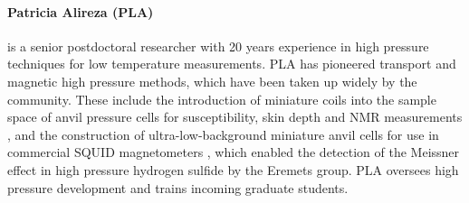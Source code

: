 \paragraph{Patricia Alireza (PLA)} is a senior postdoctoral researcher with 20 years experience in high pressure techniques for low temperature measurements. PLA has pioneered transport and magnetic high pressure methods, which have been taken up widely by the community. These include the introduction of miniature coils into the sample space of anvil pressure cells for susceptibility, skin depth and NMR measurements , and the construction of ultra-low-background miniature anvil cells for use in commercial SQUID magnetometers , which enabled the detection of the Meissner effect in high pressure hydrogen sulfide by the Eremets group. %
PLA oversees high pressure development and trains incoming graduate students.
  



